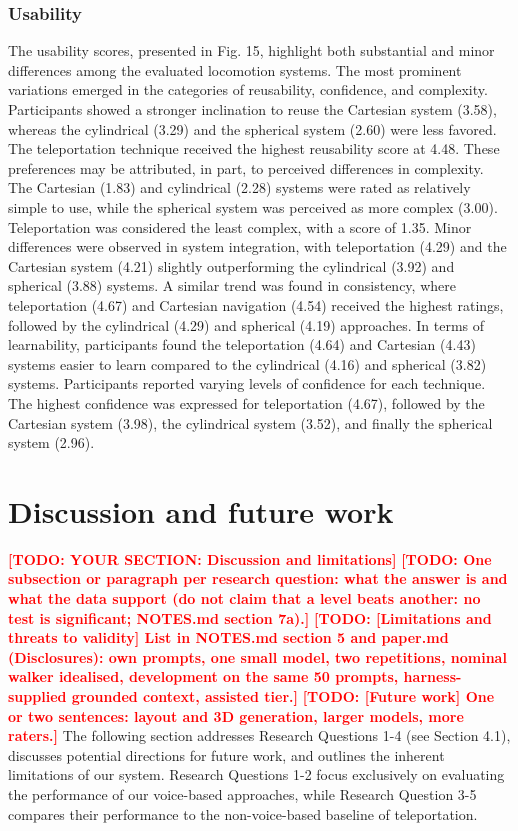 \documentclass[preprint,12pt]{elsarticle}
\newcommand{\reftext}[1]{{\color{gray}#1}}   %
\newcommand{\todo}[1]{\textcolor{red}{\textbf{[TODO: #1]}}}
\begin{document}
\subsubsection{Usability}
\reftext{The usability scores, presented in Fig. 15, highlight both substantial and minor differences among the evaluated locomotion systems. The most prominent variations emerged in the categories of reusability, confidence, and complexity. Participants showed a stronger inclination to reuse the Cartesian system (3.58), whereas the cylindrical (3.29) and the spherical system (2.60) were less favored. The teleportation technique received the highest reusability score at 4.48. These preferences may be attributed, in part, to perceived differences in complexity. The Cartesian (1.83) and cylindrical (2.28) systems were rated as relatively simple to use, while the spherical system was perceived as more complex (3.00). Teleportation was considered the least complex, with a score of 1.35. Minor differences were observed in system integration, with teleportation (4.29) and the Cartesian system (4.21) slightly outperforming the cylindrical (3.92) and spherical (3.88) systems. A similar trend was found in consistency, where teleportation (4.67) and Cartesian navigation (4.54) received the highest ratings, followed by the cylindrical (4.29) and spherical (4.19) approaches. In terms of learnability, participants found the teleportation (4.64) and Cartesian (4.43) systems easier to learn compared to the cylindrical (4.16) and spherical (3.82) systems. Participants reported varying levels of confidence for each technique. The highest confidence was expressed for teleportation (4.67), followed by the Cartesian system (3.98), the cylindrical system (3.52), and finally the spherical system (2.96).}

\section{Discussion and future work}
\todo{YOUR SECTION: Discussion and limitations}
\todo{One subsection or paragraph per research question: what the answer is and what the data support (do not claim that a level beats another: no test is significant; NOTES.md section 7a).}
\todo{[Limitations and threats to validity] List in NOTES.md section 5 and paper.md (Disclosures): own prompts, one small model, two repetitions, nominal walker idealised, development on the same 50 prompts, harness-supplied grounded context, assisted tier.}
\todo{[Future work] One or two sentences: layout and 3D generation, larger models, more raters.}
\reftext{The following section addresses Research Questions 1-4 (see Section 4.1), discusses potential directions for future work, and outlines the inherent limitations of our system. Research Questions 1-2 focus exclusively on evaluating the performance of our voice-based approaches, while Research Question 3-5 compares their performance to the non-voice-based baseline of teleportation.}
\end{document}
